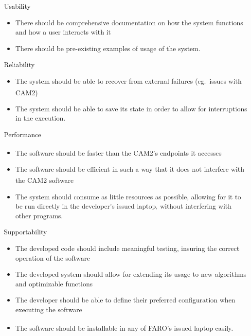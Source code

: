 \documentclass[10pt]{beamer}
\newcommand{\farons}[0]{FARO\textsuperscript{\textregistered}}
\begin{document}
  \begin{frame}{Usability}
    \begin{itemize}
      \item There should be comprehensive documentation on how the system functions and how a user interacts with it
      \item There should be pre-existing examples of usage of the system.
    \end{itemize}
  \end{frame}
  \begin{frame}{Reliability}
    \begin{itemize}
      \item The system should be able to recover from external failures (eg.\ issues with CAM2\textsuperscript{\textregistered})
      \item The system should be able to save its state in order to allow for interruptions in the execution.
    \end{itemize}
  \end{frame}
  \begin{frame}{Performance}
    \begin{itemize}
      \item The software should be faster than the CAM2\textsuperscript{\textregistered}'s endpoints it accesses
      \item The software should be efficient in such a way that it does not interfere with the CAM2\textsuperscript{\textregistered} software
      \item The system should consume as little resources as possible, allowing for it to be run directly in the developer's issued laptop, without interfering with other programs.
    \end{itemize}
  \end{frame}
  \begin{frame}{Supportability}
    \begin{itemize}
      \item The developed code should include meaningful testing, insuring the correct operation of the software
      \item The developed system should allow for extending its usage to new algorithms and optimizable functions
      \item The developer should be able to define their preferred configuration when executing the software
      \item The software should be installable in any of \farons's issued laptop easily.
    \end{itemize}
  \end{frame}
\end{document}
